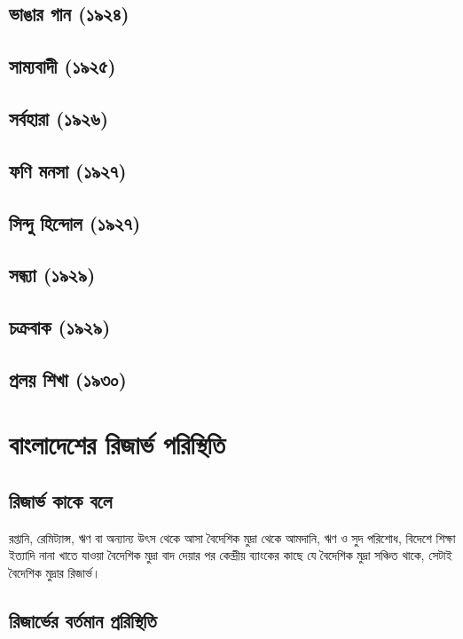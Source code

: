 \documentclass[11pt]{article}
\begin{document}
\subsection{ভাঙার গান (১৯২৪)}
\label{sec:org4e829f4}
\subsection{সাম্যবাদী (১৯২৫)}
\label{sec:orgeed3220}
\subsection{সর্বহারা (১৯২৬)}
\label{sec:orgdeb85fc}
\subsection{ফণি মনসা (১৯২৭)}
\label{sec:orgc9761d6}
\subsection{সিন্দু হিন্দোল (১৯২৭)}
\label{sec:org5a82daf}
\subsection{সন্ধ্যা (১৯২৯)}
\label{sec:org956f8f7}
\subsection{চক্রবাক (১৯২৯)}
\label{sec:orgba4c6f8}
\subsection{প্রলয় শিখা (১৯৩০)}
\label{sec:orgb07493a}


\section{বাংলাদেশের রিজার্ভ পরিস্থিতি}
\label{sec:org9dc60bc}
\subsection{রিজার্ভ কাকে বলে}
\label{sec:org07c254e}
রপ্তানি, রেমিট্যান্স, ঋণ বা অন্যান্য উৎস থেকে আসা বৈদেশিক মুদ্রা থেকে আমদানি,
ঋণ ও সুদ পরিশোধ, বিদেশে শিক্ষা ইত্যাদি নানা খাতে যাওয়া বৈদেশিক মুদ্রা বাদ
দেয়ার পর কেন্দ্রীয় ব্যাংকের কাছে যে বৈদেশিক মুদ্রা সঞ্চিত থাকে, সেটাই
বৈদেশিক মুদ্রার রিজার্ভ।

\subsection{রিজার্ভের বর্তমান প্ররিস্থিতি}
\label{sec:orga6f4136}
\end{document}
